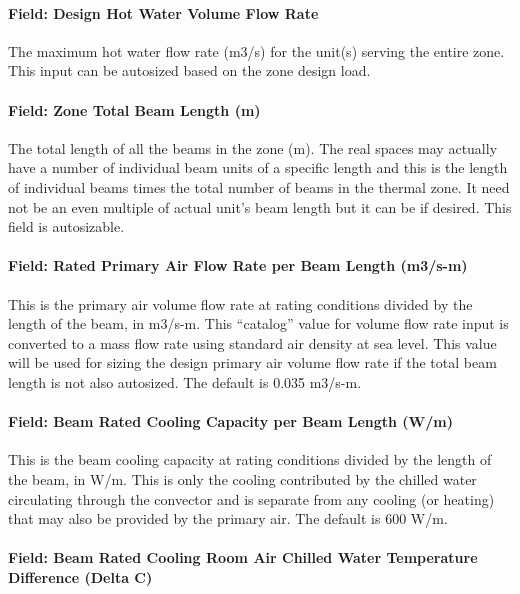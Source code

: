 \paragraph{Field: Design Hot Water Volume Flow Rate}\label{field-design-hot-water-volume-flow-rate}

The maximum hot water flow rate (m3/s) for the unit(s) serving the entire zone. This input can be autosized based on the zone design load.

\paragraph{Field: Zone Total Beam Length (m)}\label{field-zone-total-beam-length-m}

The total length of all the beams in the zone (m). The real spaces may actually have a number of individual beam units of a specific length and this is the length of individual beams times the total number of beams in the thermal zone. It need not be an even multiple of actual unit's beam length but it can be if desired. This field is autosizable.

\paragraph{Field: Rated Primary Air Flow Rate per Beam Length (m3/s-m)}\label{field-rated-primary-air-flow-rate-per-beam-length-m3s-m}

This is the primary air volume flow rate at rating conditions divided by the length of the beam, in m3/s-m. This ``catalog'' value for volume flow rate input is converted to a mass flow rate using standard air density at sea level. This value will be used for sizing the design primary air volume flow rate if the total beam length is not also autosized. The default is 0.035 m3/s-m.

\paragraph{Field: Beam Rated Cooling Capacity per Beam Length (W/m)}\label{field-beam-rated-cooling-capacity-per-beam-length-wm}

This is the beam cooling capacity at rating conditions divided by the length of the beam, in W/m. This is only the cooling contributed by the chilled water circulating through the convector and is separate from any cooling (or heating) that may also be provided by the primary air. The default is 600 W/m.

\paragraph{Field: Beam Rated Cooling Room Air Chilled Water Temperature Difference (Delta C)}\label{field-beam-rated-cooling-room-air-chilled-water-temperature-difference-delta-c}

